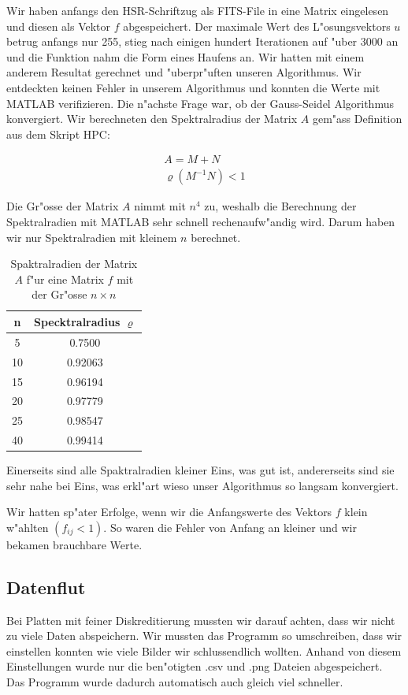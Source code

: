 \begin{refsection}
Wir haben anfangs den HSR-Schriftzug als FITS-File in eine Matrix 
eingelesen und diesen als Vektor $f$ abgespeichert. Der maximale
Wert des L"osungsvektors $u$ betrug anfangs nur 255, stieg nach
einigen hundert Iterationen auf "uber 3000 an und die Funktion nahm
die Form eines Haufens an. Wir hatten mit einem anderem Resultat
gerechnet und "uberpr"uften unseren Algorithmus. Wir entdeckten
keinen Fehler in unserem Algorithmus und konnten die Werte mit
MATLAB verifizieren. Die n"achste Frage war, ob der Gauss-Seidel
Algorithmus konvergiert. Wir berechneten den Spektralradius der
Matrix $A$ gem"ass Definition aus dem Skript
HPC\cite{mueller:hpcseminar}:
	
\begin{eqnarray}
A = M+N\\
\varrho(M^{-1}N)<1
\end{eqnarray}
		
Die Gr"osse der Matrix $A$ nimmt mit $n^4$ zu, weshalb die Berechnung
der Spektralradien mit MATLAB sehr schnell rechenaufw"andig wird.
Darum haben wir nur Spektralradien mit kleinem $n$ berechnet.
		
\begin{table}
\begin{tabular}{cc}
n & Specktralradius $\varrho$\\\hline
5 & 0.7500\\
10 & 0.92063\\
15 & 0.96194\\
20 & 0.97779\\
25 & 0.98547\\
40 & 0.99414
\end{tabular}
\centering
\caption{Spaktralradien der Matrix $A$ f"ur eine Matrix $f$ mit der Gr"osse $n\times n$}
\end{table}
	
Einerseits sind alle Spaktralradien kleiner Eins, was gut ist,
andererseits sind sie sehr nahe bei Eins, was erkl"art wieso unser
Algorithmus so langsam konvergiert.
		
Wir hatten sp"ater Erfolge, wenn wir die Anfangswerte des Vektors
$f$ klein w"ahlten $(f_{ij}<1)$. So waren die Fehler von Anfang an
kleiner und wir bekamen brauchbare Werte.
	
\subsection{Datenflut}
	
Bei Platten mit feiner Diskreditierung mussten wir darauf achten,
dass wir nicht zu viele Daten abspeichern. Wir mussten das Programm
so umschreiben, dass wir einstellen konnten wie viele Bilder wir
schlussendlich wollten. Anhand von diesem Einstellungen wurde nur
die ben"otigten .csv und .png Dateien abgespeichert. Das Programm
wurde dadurch automatisch auch gleich viel schneller.
		

\end{refsection}

